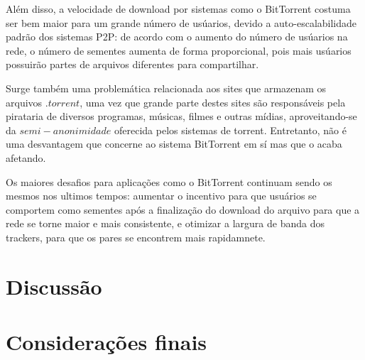 \documentclass[a4paper]{article}
\begin{document}
Além disso, a velocidade de download por sistemas como o BitTorrent costuma ser bem maior para um grande número de usúarios, devido a auto-escalabilidade padrão dos sistemas P2P: de acordo com o aumento do número de usúarios na rede, o número de sementes aumenta de forma proporcional, pois mais usúarios possuirão partes de arquivos diferentes para compartilhar.\cite{pouwelsebit}

Surge também uma problemática relacionada aos sites que armazenam os arquivos $.torrent$, uma vez que grande parte destes sites são responsáveis pela pirataria de diversos programas, músicas, filmes e outras mídias, aproveitando-se da $semi-anonimidade$ oferecida pelos sistemas de torrent. Entretanto, não é uma desvantagem que concerne ao sistema BitTorrent em sí mas que o acaba afetando.

Os maiores desafios para aplicações como o BitTorrent continuam sendo os mesmos nos ultimos tempos: aumentar o incentivo para que usuários se comportem como sementes após a finalização do download do arquivo para que a rede se torne maior e mais consistente,  e otimizar a largura de banda dos trackers, para que os pares se encontrem mais rapidamnete.

\newpage

\section{Discussão}
\newpage

\section{Considerações finais}
\newpage


\newpage



\end{document}
